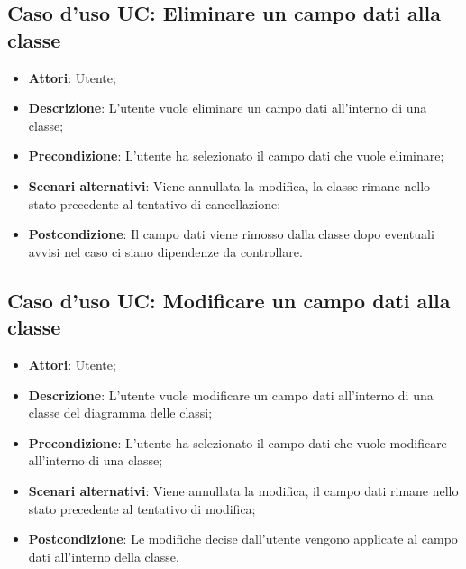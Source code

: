 \documentclass[../AnalisiDeiRequisiti.tex]{subfiles}
\begin{document}
	\subsection{Caso d'uso UC: Eliminare un campo dati alla classe}
	\begin{itemize}
		\item \textbf{Attori}: Utente;
		
		\item \textbf{Descrizione}: L'utente vuole eliminare un campo dati all'interno di una classe;
		
		\item \textbf{Precondizione}: L'utente ha selezionato il campo dati che vuole eliminare;
		
		\item \textbf{Scenari alternativi}: Viene annullata la modifica, la classe
		rimane nello stato precedente al tentativo di cancellazione;
		
		
		\item \textbf{Postcondizione}: Il campo dati viene rimosso dalla classe dopo eventuali avvisi nel caso ci siano dipendenze da controllare.
	\end{itemize}
	
	\subsection{Caso d'uso UC: Modificare un campo dati alla classe}
	\begin{itemize}
		\item \textbf{Attori}: Utente;
		
		\item \textbf{Descrizione}: L'utente vuole modificare un campo dati all'interno di una classe del diagramma delle classi;
		
		\item \textbf{Precondizione}: L'utente ha selezionato il campo dati che vuole modificare all'interno di una classe;
		
		\item \textbf{Scenari alternativi}: Viene annullata la modifica, il campo dati
		rimane nello stato precedente al tentativo di modifica;
		
		\item \textbf{Postcondizione}: Le modifiche decise dall'utente vengono applicate al campo dati all'interno della classe.
	\end{itemize}
	
\end{document}
